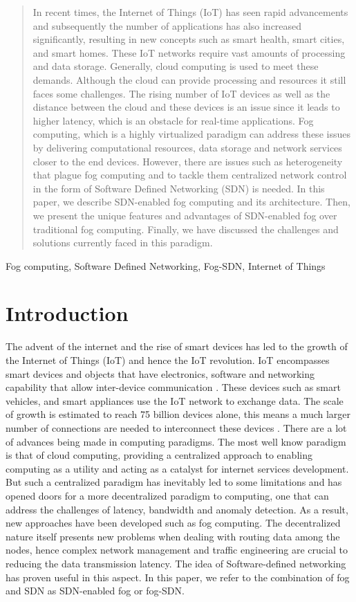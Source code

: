 \documentclass[conference]{IEEEtran}
\begin{document}
\begin{abstract}
In recent times, the Internet of Things (IoT) has seen rapid advancements and subsequently the number of applications has also increased significantly, resulting in new concepts such as smart health, smart cities, and smart homes. These IoT networks require vast amounts of processing and data storage. Generally, cloud computing is used to meet these demands. Although the cloud can provide processing and resources it still faces some challenges. The rising number of IoT devices as well as the distance between the cloud and these devices is an issue since it leads to higher latency, which is an obstacle for real-time applications. Fog computing, which is a highly virtualized paradigm can address these issues by delivering computational resources, data storage and network services closer to the end devices. However, there are issues such as heterogeneity that plague fog computing and to tackle them centralized network control in the form of Software Defined Networking (SDN) is needed. In this paper, we describe SDN-enabled fog computing and its architecture. Then, we present the unique features and advantages of SDN-enabled fog over traditional fog computing. Finally, we have discussed the challenges and solutions currently faced in this paradigm.
\end{abstract}

\begin{IEEEkeywords}
Fog computing, Software Defined Networking, Fog-SDN, Internet of Things
\end{IEEEkeywords}

\section{Introduction}
The   advent of the internet and the rise of smart devices has led to the growth of the Internet of Things (IoT) and hence the IoT revolution. IoT encompasses smart devices and objects that have electronics, software and networking capability that allow inter-device communication \cite{donno}. These devices such as smart vehicles, and smart appliances use the IoT network to exchange data. The scale of growth is estimated to reach 75 billion devices alone,  this means a much larger number of connections are needed to interconnect these devices \cite{vail}. There are a lot of advances being made in computing paradigms. The most well know paradigm is that of cloud computing, providing a centralized approach to enabling computing as a utility and acting as a catalyst for internet services development. But such a centralized paradigm has inevitably led to some limitations and has opened doors for a more decentralized paradigm to computing, one that can address the challenges of latency, bandwidth and anomaly detection. As a result, new approaches have been developed such as fog computing. The decentralized nature itself presents new problems when dealing with routing data among the nodes, hence complex network management and traffic engineering are crucial to reducing the data transmission latency. The idea of Software-defined networking has proven useful in this aspect. In this paper, we refer to the combination of fog and SDN as SDN-enabled fog or fog-SDN.
\end{document}
